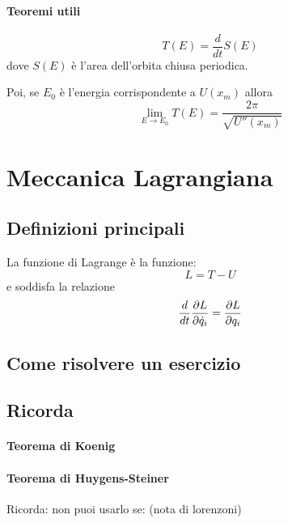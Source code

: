 \documentclass[a4paper,12pt]{article}
\begin{document}
\paragraph{Teoremi utili}
$$T(E) = \dfrac{d}{dt}S(E)$$
dove $S(E)$ è l'area dell'orbita chiusa periodica.

Poi, se $E_0$ è l'energia corrispondente a $U(x_m)$ allora $$\lim_{E\to E_0} T(E) = \dfrac{2\pi}{\sqrt{U''(x_m)}}$$


\section{Meccanica Lagrangiana}
\subsection{Definizioni principali}
La funzione di Lagrange è la funzione:
$$ L = T - U $$
e soddisfa la relazione
$${d \over dt}\dfrac{\partial L}{\partial\dot{q}_i} = \dfrac{\partial L}{\partial q_i}$$
\subsection{Come risolvere un esercizio}

\subsection{Ricorda}
\paragraph{Teorema di Koenig}

\paragraph{Teorema di Huygens-Steiner}
Ricorda: non puoi usarlo se: (nota di lorenzoni)
\end{document}
